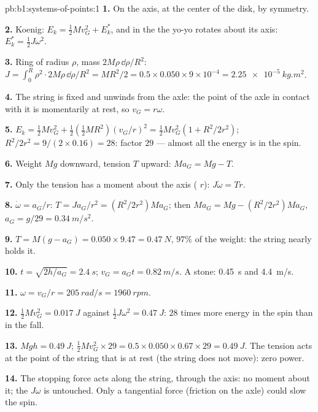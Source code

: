 \begin{solution}{pb:b1:systems-of-points:1}
\textbf{1.} On the axis, at the center of the disk, by symmetry.

\textbf{2.} Koenig: $E_k = \tfrac12 Mv_G^2 + E_k^*$, and in the  the yo-yo rotates about its axis: $E_k^* = \tfrac12 J\omega^2$.

\textbf{3.} Ring of radius $\rho$, mass $2M\rho\,\dd\rho/R^2$: $J = \int_0^R
\rho^2\cdot 2M\rho\,\dd\rho/R^2 = MR^2/2 = 0.5 \times 0.050 \times 9\times10^{-4}
= \qty{2.25e-5}{kg.m^2}$.

\textbf{4.} The string is fixed and unwinds from the axle: the point of
the axle in contact with it is momentarily at rest, so $v_G = r\omega$.

\textbf{5.} $E_k = \tfrac12 Mv_G^2 + \tfrac12(\tfrac12 MR^2)(v_G/r)^2 = \tfrac12
Mv_G^2(1 + R^2/2r^2)$; $R^2/2r^2 = 9/(2 \times 0.16) = 28$: factor $29$ ---
almost all the energy is in the spin.

\textbf{6.} Weight $Mg$ downward, tension $T$ upward: $Ma_G = Mg - T$.

\textbf{7.} Only the tension has a moment about the axis ( $r$):
$J\dot\omega = Tr$.

\textbf{8.} $\dot\omega = a_G/r$: $T = Ja_G/r^2 = (R^2/2r^2)Ma_G$; then
$Ma_G = Mg - (R^2/2r^2)Ma_G$, $a_G = g/29 = \qty{0.34}{m/s^2}$.

\textbf{9.} $T = M(g - a_G) = 0.050 \times 9.47 = \qty{0.47}{N}$, $97\%$ of
the weight: the string nearly holds it.

\textbf{10.} $t = \sqrt{2h/a_G} = \qty{2.4}{s}$; $v_G = a_Gt = \qty{0.82}{m/s}$.
A stone: \qty{0.45}{s} and \qty{4.4}{m/s}.

\textbf{11.} $\omega = v_G/r = \qty{205}{rad/s} = \qty{1960}{rpm}$.

\textbf{12.} $\tfrac12 Mv_G^2 = \qty{0.017}{J}$ against $\tfrac12 J\omega^2 =
\qty{0.47}{J}$: $28$ times more energy in the spin than in the fall.

\textbf{13.} $Mgh = \qty{0.49}{J}$; $\tfrac12 Mv_G^2 \times 29 = 0.5 \times 0.050
\times 0.67 \times 29 = \qty{0.49}{J}$. The tension acts at the point of the
string that is at rest (the string does not move): zero power.

\textbf{14.} The stopping force acts along the string, through the axis:
no moment about it; the  $J\omega$ is untouched. Only a
tangential force (friction on the axle) could slow the spin.


\end{solution}
